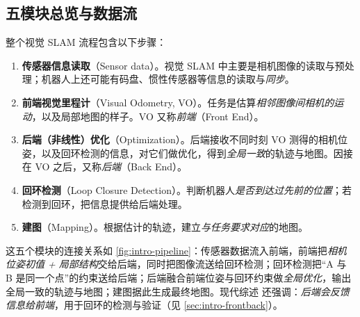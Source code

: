 \subsection{五模块总览与数据流}
\label{sec:intro-pipeline}
整个视觉 SLAM 流程包含以下步骤\cite{gaoxiang2019slam14}：

\begin{enumerate}
  \item \textbf{传感器信息读取}（Sensor data）。视觉 SLAM 中主要是相机图像的读取与预处理；机器人上还可能有码盘、惯性传感器等信息的读取与\emph{同步}。
  \item \textbf{前端视觉里程计}（Visual Odometry, VO）。任务是估算\emph{相邻图像间相机的运动}，以及局部地图的样子。VO 又称\emph{前端}（Front End）。
  \item \textbf{后端（非线性）优化}（Optimization）。后端接收不同时刻 VO 测得的相机位姿，以及回环检测的信息，对它们做优化，得到\emph{全局一致}的轨迹与地图。因接在 VO 之后，又称\emph{后端}（Back End）。
  \item \textbf{回环检测}（Loop Closure Detection）。判断机器人\emph{是否到达过先前的位置}；若检测到回环，把信息提供给后端处理。
  \item \textbf{建图}（Mapping）。根据估计的轨迹，建立\emph{与任务要求对应}的地图。
\end{enumerate}

\noindent 这五个模块的连接关系如 \cref{fig:intro-pipeline}：传感器数据流入前端，前端把\emph{相机位姿初值 + 局部结构}交给后端，同时把图像流送给回环检测；回环检测把“A 与 B 是同一个点”的约束送给后端；后端融合前端位姿与回环约束做\emph{全局优化}，输出全局一致的轨迹与地图；建图据此生成最终地图。现代综述\cite{cadena2016past} 还强调：\emph{后端会反馈信息给前端}，用于回环的检测与验证（见 \cref{sec:intro-frontback}）。

